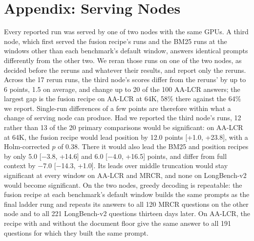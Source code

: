 \documentclass[letterpaper]{article} %
\newcommand{\recipe}{fusion recipe}
\begin{document}
\begin{table}[t]
\centering
\small

\caption{The ablation ladders at each benchmark's default window. Each rung adds one of the \recipe's steps to the rung above it, and the last rung is the recipe. $\Delta$ is the paired difference from the rung above in points, with its 95\% bootstrap interval.}
\label{tab:ladder}
\end{table}

\section{Appendix: Serving Nodes}
Every reported run was served by one of two nodes with the same GPUs. A third node, which first served the \recipe's runs and the BM25 runs at the windows other than each benchmark's default window, answers identical prompts differently from the other two. We reran those runs on one of the two nodes, as decided before the reruns and whatever their results, and report only the reruns. Across the 17 rerun runs, the third node's scores differ from the reruns' by up to 6 points, 1.5 on average, and change up to 20 of the 100 AA-LCR answers; the largest gap is the \recipe{} on AA-LCR at 64K, 58\% there against the 64\% we report. Single-run differences of a few points are therefore within what a change of serving node can produce. Had we reported the third node's runs, 12 rather than 13 of the 20 primary comparisons would be significant: on AA-LCR at 64K, the \recipe{} would lead position by 12.0 points [+1.0, +23.8], with a Holm-corrected $p$ of 0.38. There it would also lead the BM25 and position recipes by only 5.0 [$-$3.8, +14.6] and 6.0 [$-$4.0, +16.5] points, and differ from full context by $-$7.0 [$-$14.3, +1.0]. Its leads over middle truncation would stay significant at every window on AA-LCR and MRCR, and none on LongBench-v2 would become significant. On the two nodes, greedy decoding is repeatable: the \recipe{} at each benchmark's default window builds the same prompts as the final ladder rung and repeats its answers to all 120 MRCR questions on the other node and to all 221 LongBench-v2 questions thirteen days later. On AA-LCR, the recipe with and without the document floor give the same answer to all 191 questions for which they built the same prompt.
\end{document}
